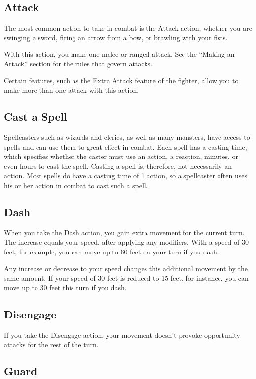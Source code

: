 \subsection{Attack}

The most common action to take in combat is the Attack action, whether you are swinging a sword, firing an arrow from a bow, or brawling with your fists.

With this action, you make one melee or ranged attack. See the “Making an Attack” section for the rules that govern attacks.

Certain features, such as the Extra Attack feature of the fighter, allow you to make more than one attack with this action.

\subsection{Cast a Spell}

Spellcasters such as wizards and clerics, as well as many monsters, have access to spells and can use them to great effect in combat. Each spell has a casting time, which specifies whether the caster must use an action, a reaction, minutes, or even hours to cast the spell. Casting a spell is, therefore, not necessarily an action. Most spells do have a casting time of 1 action, so a spellcaster often uses his or her action in combat to cast such a spell.

\subsection{Dash}

When you take the Dash action, you gain extra movement for the current turn. The increase equals your speed, after applying any modifiers. With a speed of 30 feet, for example, you can move up to 60 feet on your turn if you dash.

Any increase or decrease to your speed changes this additional movement by the same amount. If your speed of 30 feet is reduced to 15 feet, for instance, you can move up to 30 feet this turn if you dash.

\subsection{Disengage}

If you take the Disengage action, your movement doesn't provoke opportunity attacks for the rest of the turn.

\subsection{Guard}


